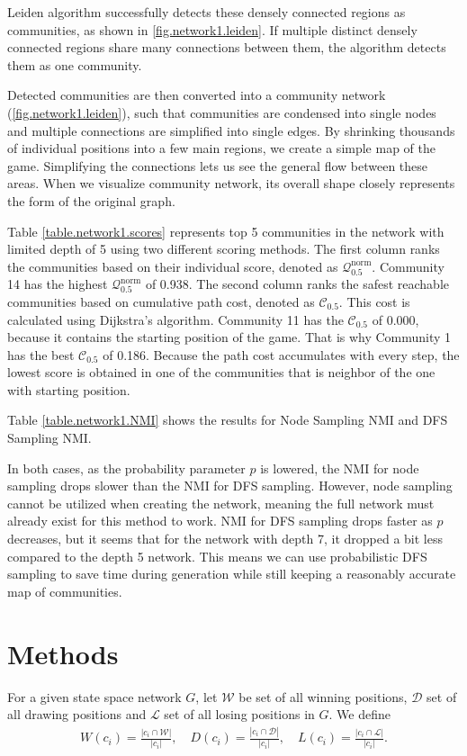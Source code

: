\documentclass[9pt,twocolumn,twoside]{pnas-report}
\begin{document}
Leiden algorithm successfully detects these densely connected regions as communities, as shown in \ref{fig.network1.leiden}. If multiple distinct densely connected regions share many connections between them, the algorithm detects them as one community. 

Detected communities are then converted into a community network (\ref{fig.network1.leiden}), such that communities are condensed into single nodes and multiple connections are simplified into single edges. By shrinking thousands of individual positions into a few main regions, we create a simple map of the game. Simplifying the connections lets us see the general flow between these areas. When we visualize community network, its overall shape closely represents the form of the original graph.

Table \ref{table.network1.scores} represents top 5 communities in the network with limited depth of 5 using two different scoring methods. The first column ranks the communities based on their individual score, denoted as $\mathcal{Q}_{0.5}^\text{norm}$. Community 14 has the highest $\mathcal{Q}_{0.5}^\text{norm}$ of 0.938. The second column ranks the safest reachable communities based on cumulative path cost, denoted as $\mathcal{C}_{0.5}$. This cost is calculated using Dijkstra's algorithm. Community 11 has the $\mathcal{C}_{0.5}$ of 0.000, because it contains the starting position of the game. That is why Community 1 has the best $\mathcal{C}_{0.5}$ of 0.186. Because the path cost accumulates with every step, the lowest score is obtained in one of the communities that is neighbor of the one with starting position. 

Table \ref{table.network1.NMI} shows the results for Node Sampling NMI and DFS Sampling NMI.

In both cases, as the probability parameter $p$ is lowered, the NMI for node sampling drops slower than the NMI for DFS sampling. However, node sampling cannot be utilized when creating the network, meaning the full network must already exist for this method to work. NMI for DFS sampling drops faster as $p$ decreases, but it seems that for the network with depth 7, it dropped a bit less compared to the depth 5 network. This means we can use probabilistic DFS sampling to save time during generation while still keeping a reasonably accurate map of communities.

\section*{Methods}
For a given state space network $G$, let $\mathcal{W}$ be set of all winning positions, $\mathcal{D}$ set of all drawing positions and $\mathcal{L}$ set of all losing positions in $G$. We define
\begin{align*}
    W(c_i) = \frac{|c_i \cap \mathcal{W}|}{|c_i|}, \quad  D(c_i) = \frac{|c_i \cap \mathcal{D}|}{|c_i|}, \quad L(c_i) = \frac{|c_i \cap \mathcal{L}|}{|c_i|}.
\end{align*}
\end{document}
